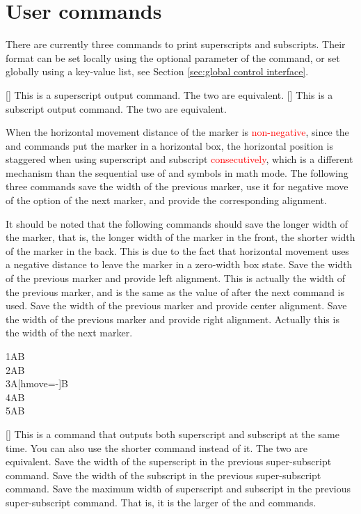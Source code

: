 \documentclass[load-preamble+]{cnltx-doc}
\renewcommand{\emph}[1]{\textcolor{red}{#1}}
\begin{document}
\section{User commands}
\label{sec:user commands}
There are currently three commands to print superscripts and subscripts. Their format can be set locally using the optional parameter of the command, or set globally using a key-value list, see Section \ref{sec:global control interface}.
\begin{commands}
  [\sarg{}]
  This is a superscript output command. The two  are equivalent.
  [\sarg{}]
  This is a subscript output command. The two  are equivalent.

  When the horizontal movement distance of the marker is \emph{non-negative}, since the  and  commands put the marker in a horizontal box, the horizontal position is staggered when using superscript and subscript \emph{consecutively}, which is a different mechanism than the sequential use of \code{\^{}} and \code{\_{}} symbols in math mode. The following three commands save the width of the previous marker, use it for negative move of the  option of the next marker, and provide the corresponding alignment.

  It should be noted that the following commands should save the longer width of the marker, that is, the longer width of the marker in the front, the shorter width of the marker in the back. This is due to the fact that horizontal movement uses a negative distance to leave the marker in a zero-width box state.
  Save the width of the previous marker and provide left alignment. This is actually the width of the previous marker, and is the same as the value of  after the next command is used.
  Save the width of the previous marker and provide center alignment. 
  Save the width of the previous marker and provide right alignment. Actually this is the width of the next marker.
  \begin{example}
  1AB \\
  2AB \\
  3A[hmove=-\llastwd]B \\
  4AB \\
  5AB
  \end{example}
  [\sarg{}]
  This is a command that outputs both superscript and subscript at the same time. You can also use the shorter command  instead of it. The two  are equivalent.
  Save the width of the superscript in the previous super-subscript command.
  Save the width of the subscript in the previous super-subscript command.
  Save the maximum width of superscript and subscript in the previous super-subscript command. That is, it is the larger of the  and  commands.


\end{commands}
\end{document}
